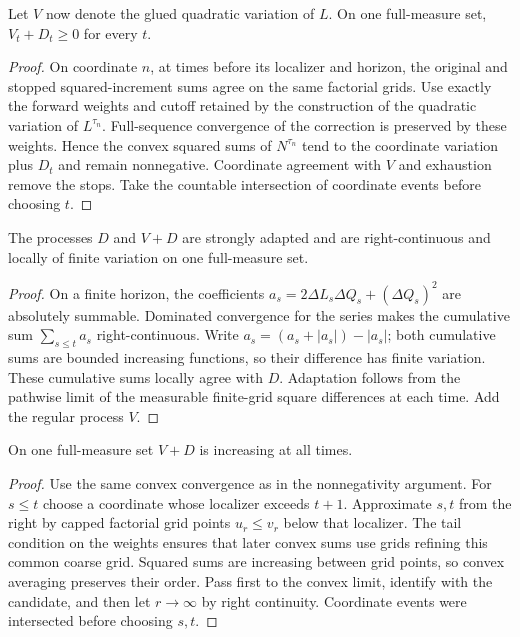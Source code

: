 \begin{lemma}
Let $V$ now denote the glued quadratic variation of $L$. On one full-measure
set, $V_t+D_t\geq0$ for every $t$.
\end{lemma}
\begin{proof}
On coordinate $n$, at times before its localizer and horizon, the original
and stopped squared-increment sums agree on the same factorial grids.
Use exactly the forward weights and cutoff retained by the construction
of the quadratic variation of $L^{\tau_n}$. Full-sequence convergence of the
correction is preserved by these weights. Hence the convex squared sums of
$N^{\tau_n}$ tend to the coordinate variation plus $D_t$ and remain
nonnegative. Coordinate agreement with $V$ and exhaustion remove the stops.
Take the countable intersection of coordinate events before choosing $t$.
\end{proof}
\begin{lemma}
The processes $D$ and $V+D$ are strongly adapted and are right-continuous
and locally of finite variation on one full-measure set.
\end{lemma}
\begin{proof}
On a finite horizon, the coefficients
$a_s=2\Delta L_s\Delta Q_s+(\Delta Q_s)^2$ are absolutely summable.
Dominated convergence for the series makes the cumulative sum
$\sum_{s\leq t}a_s$ right-continuous. Write
$a_s=(a_s+|a_s|)-|a_s|$; both cumulative sums are bounded increasing functions,
so their difference has finite variation. These cumulative sums locally
agree with $D$. Adaptation follows from the pathwise limit of the measurable
finite-grid square differences at each time. Add the regular process $V$.
\end{proof}
\begin{lemma}
On one full-measure set $V+D$ is increasing at all times.
\end{lemma}
\begin{proof}
Use the same convex convergence as in the nonnegativity argument. For $s\leq t$
choose a coordinate whose localizer exceeds $t+1$. Approximate $s,t$ from the
right by capped factorial grid points $u_r\leq v_r$ below that localizer.
The tail condition on the weights ensures that later convex sums use grids
refining this common coarse grid. Squared sums are increasing between grid
points, so convex averaging preserves their order. Pass first to the convex
limit, identify with the candidate, and then let $r\to\infty$ by right
continuity. Coordinate events were intersected before choosing $s,t$.
\end{proof}
